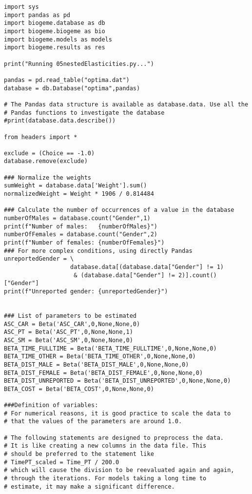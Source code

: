 \documentclass[12pt,a4paper]{article}
\begin{document}
\begin{lstlisting}[style=numbers]
import sys
import pandas as pd
import biogeme.database as db
import biogeme.biogeme as bio
import biogeme.models as models
import biogeme.results as res

print("Running 05nestedElasticities.py...")

pandas = pd.read_table("optima.dat")
database = db.Database("optima",pandas)

# The Pandas data structure is available as database.data. Use all the
# Pandas functions to investigate the database
#print(database.data.describe())

from headers import *

exclude = (Choice == -1.0)
database.remove(exclude)

### Normalize the weights
sumWeight = database.data['Weight'].sum()
normalizedWeight = Weight * 1906 / 0.814484

### Calculate the number of occurrences of a value in the database
numberOfMales = database.count("Gender",1)
print(f"Number of males:   {numberOfMales}")
numberOfFemales = database.count("Gender",2)
print(f"Number of females: {numberOfFemales}")
### For more complex conditions, using directly Pandas
unreportedGender = \
                   database.data[(database.data["Gender"] != 1)
                    & (database.data["Gender"] != 2)].count()["Gender"]
print(f"Unreported gender: {unreportedGender}")


### List of parameters to be estimated
ASC_CAR = Beta('ASC_CAR',0,None,None,0)
ASC_PT = Beta('ASC_PT',0,None,None,1)
ASC_SM = Beta('ASC_SM',0,None,None,0)
BETA_TIME_FULLTIME = Beta('BETA_TIME_FULLTIME',0,None,None,0)
BETA_TIME_OTHER = Beta('BETA_TIME_OTHER',0,None,None,0)
BETA_DIST_MALE = Beta('BETA_DIST_MALE',0,None,None,0)
BETA_DIST_FEMALE = Beta('BETA_DIST_FEMALE',0,None,None,0)
BETA_DIST_UNREPORTED = Beta('BETA_DIST_UNREPORTED',0,None,None,0)
BETA_COST = Beta('BETA_COST',0,None,None,0)

###Definition of variables:
# For numerical reasons, it is good practice to scale the data to
# that the values of the parameters are around 1.0.

# The following statements are designed to preprocess the data.
# It is like creating a new columns in the data file. This
# should be preferred to the statement like
# TimePT_scaled = Time_PT / 200.0
# which will cause the division to be reevaluated again and again,
# through the iterations. For models taking a long time to
# estimate, it may make a significant difference.


\end{lstlisting}
\end{document}
